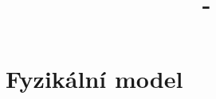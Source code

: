 \documentclass [a4paper,11pt,oneside,notitlepage,openright]{report} %
\author{\Autor}
\title{\Jmeno - \NazevCJ}
\begin{document}

\cleardoublepage

\pagestyle{plain}


\newpage


\cleardoublepage


\cleardoublepage

%

%
\cleardoublepage

\tableofcontents
\cleardoublepage

\cleardoublepage

\cleardoublepage





		
	\part{Fyzikální model}\label{part:model}
		
\end{document}

